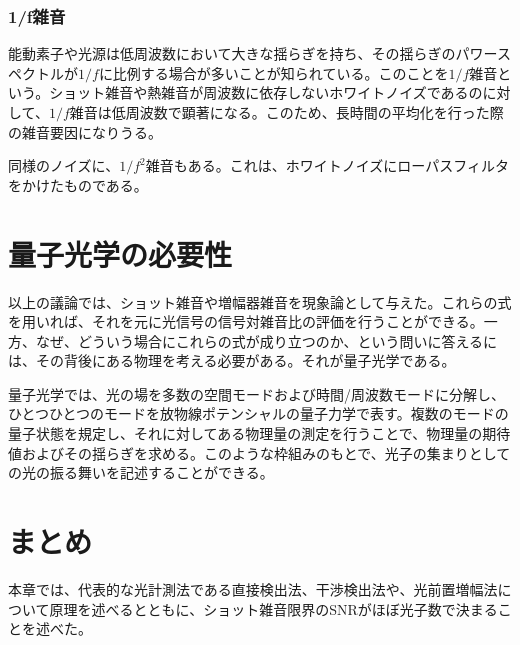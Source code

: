 \subsubsection{1/f雑音}
能動素子や光源は低周波数において大きな揺らぎを持ち、その揺らぎのパワースペクトルが$1/f$に比例する場合が多いことが知られている。このことを$1/f$雑音という。ショット雑音や熱雑音が周波数に依存しないホワイトノイズであるのに対して、$1/f$雑音は低周波数で顕著になる。このため、長時間の平均化を行った際の雑音要因になりうる。

同様のノイズに、$1/f^2$雑音もある。これは、ホワイトノイズにローパスフィルタをかけたものである。


\section{量子光学の必要性}
以上の議論では、ショット雑音や増幅器雑音を現象論として与えた。これらの式を用いれば、それを元に光信号の信号対雑音比の評価を行うことができる。一方、なぜ、どういう場合にこれらの式が成り立つのか、という問いに答えるには、その背後にある物理を考える必要がある。それが量子光学である。

	
量子光学では、光の場を多数の空間モードおよび時間/周波数モードに分解し、ひとつひとつのモードを放物線ポテンシャルの量子力学で表す。複数のモードの量子状態を規定し、それに対してある物理量の測定を行うことで、物理量の期待値およびその揺らぎを求める。このような枠組みのもとで、光子の集まりとしての光の振る舞いを記述することができる。

\section{まとめ}
本章では、代表的な光計測法である直接検出法、干渉検出法や、光前置増幅法について原理を述べるとともに、ショット雑音限界のSNRがほぼ光子数で決まることを述べた。

